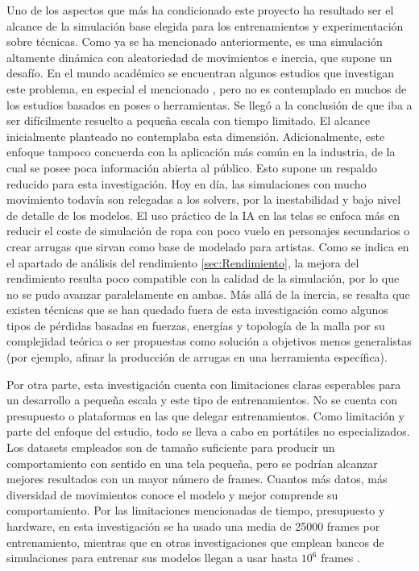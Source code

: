 Uno de los aspectos que más ha condicionado este proyecto ha resultado ser el alcance de la simulación base elegida para los entrenamientos y experimentación sobre técnicas. Como ya se ha mencionado anteriormente, es una simulación altamente dinámica con aleatoriedad de movimientos e inercia, que supone un desafío. En el mundo académico se encuentran algunos estudios que investigan este problema, en especial el mencionado \cite{bertiche2022neural}, pero no es contemplado en muchos de los estudios basados en poses o herramientas. Se llegó a la conclusión de que iba a ser difícilmente resuelto a pequeña escala con tiempo limitado. El alcance inicialmente planteado no contemplaba esta dimensión. Adicionalmente, este enfoque tampoco concuerda con la aplicación más común en la industria, de la cual se posee poca información abierta al público. Esto supone un respaldo reducido para esta investigación. Hoy en día, las simulaciones con mucho movimiento todavía son relegadas a los solvers, por la inestabilidad y bajo nivel de detalle de los modelos. El uso práctico de la IA en las telas se enfoca más en reducir el coste de simulación de ropa con poco vuelo en personajes secundarios o crear arrugas que sirvan como base de modelado para artistas. Como se indica en el apartado de análisis del rendimiento \ref{sec:Rendimiento}, la mejora del rendimiento resulta poco compatible con la calidad de la simulación, por lo que no se pudo avanzar paralelamente en ambas. Más allá de la inercia, se resalta que existen técnicas que se han quedado fuera de esta investigación como algunos tipos de pérdidas basadas en fuerzas, energías y topología de la malla por su complejidad teórica o ser propuestas como solución a objetivos menos generalistas (por ejemplo, afinar la producción de arrugas en una herramienta específica). \newline

Por otra parte, esta investigación cuenta con limitaciones claras esperables para un desarrollo a pequeña escala y este tipo de entrenamientos. No se cuenta con presupuesto o plataformas en las que delegar entrenamientos. Como limitación y parte del enfoque del estudio, todo se lleva a cabo en portátiles no especializados. Los datasets empleados son de tamaño suficiente para producir un comportamiento con sentido en una tela pequeña, pero se podrían alcanzar mejores resultados con un mayor número de frames. Cuantos más datos, más diversidad de movimientos conoce el modelo y mejor comprende su comportamiento. Por las limitaciones mencionadas de tiempo, presupuesto y hardware, en esta investigación se ha usado una media de 25000 frames por entrenamiento, mientras que en otras investigaciones que emplean bancos de simulaciones para entrenar sus modelos llegan a usar hasta $10^{6}$ frames \cite{holden_subspace_2019}. \newline

